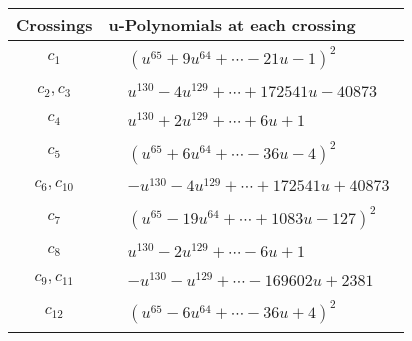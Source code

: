 \documentclass[1p]{elsarticle_modified}
\theoremstyle{definition}
\begin{document}
\begin{tabular}{m{50pt}|m{274pt}}
Crossings & \hspace{64pt}u-Polynomials at each crossing \\
\hline $$\begin{aligned}c_{1}\end{aligned}$$&$\begin{aligned}
&(u^{65}+9 u^{64}+\cdots-21 u-1)^{2}
\end{aligned}$\\
\hline $$\begin{aligned}c_{2},c_{3}\end{aligned}$$&$\begin{aligned}
&u^{130}-4 u^{129}+\cdots+172541 u-40873
\end{aligned}$\\
\hline $$\begin{aligned}c_{4}\end{aligned}$$&$\begin{aligned}
&u^{130}+2 u^{129}+\cdots+6 u+1
\end{aligned}$\\
\hline $$\begin{aligned}c_{5}\end{aligned}$$&$\begin{aligned}
&(u^{65}+6 u^{64}+\cdots-36 u-4)^{2}
\end{aligned}$\\
\hline $$\begin{aligned}c_{6},c_{10}\end{aligned}$$&$\begin{aligned}
&- u^{130}-4 u^{129}+\cdots+172541 u+40873
\end{aligned}$\\
\hline $$\begin{aligned}c_{7}\end{aligned}$$&$\begin{aligned}
&(u^{65}-19 u^{64}+\cdots+1083 u-127)^{2}
\end{aligned}$\\
\hline $$\begin{aligned}c_{8}\end{aligned}$$&$\begin{aligned}
&u^{130}-2 u^{129}+\cdots-6 u+1
\end{aligned}$\\
\hline $$\begin{aligned}c_{9},c_{11}\end{aligned}$$&$\begin{aligned}
&- u^{130}- u^{129}+\cdots-169602 u+2381
\end{aligned}$\\
\hline $$\begin{aligned}c_{12}\end{aligned}$$&$\begin{aligned}
&(u^{65}-6 u^{64}+\cdots-36 u+4)^{2}
\end{aligned}$\\
\hline
\end{tabular}\\~\\
\end{document}
